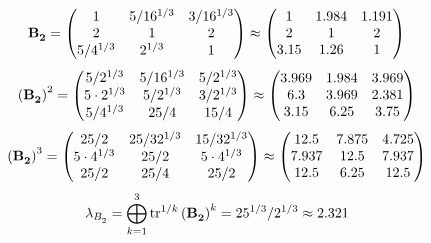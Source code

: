 \documentclass[10pt,a4paper]{article}
\begin{document}
	\[
		\bold{B_2^{}} = 
		\begin{pmatrix}
			{1}{} & {{5}} / {{16^ {1 / 3}}} & {{3}} / {{16^ {1 / 3}}} \\
			{{2}}{} & {1}{} & {{2}}{} \\
			{{5}} / {{4^ {1 / 3}}} & {{2^ {1 / 3}}}{} & {1}{} \\
		\end{pmatrix}
		\approx
		\begin{pmatrix}
			1        & 1.984    & 1.191    \\
			2        & 1        & 2        \\
			3.15     & 1.26     & 1        \\
		\end{pmatrix}
	\]
	\[
		\left(\bold{B_2^{}}\right)^{2} = 
		\begin{pmatrix}
			{{5}} / {{2^ {1 / 3}}} & {{5}} / {{16^ {1 / 3}}} & {{5}} / {{2^ {1 / 3}}} \\
			{{5} \cdot {2^ {1 / 3}}}{} & {{5}} / {{2^ {1 / 3}}} & {{3}} / {{2^ {1 / 3}}} \\
			{{5}} / {{4^ {1 / 3}}} & {{25}} / {{4}} & {{15}} / {{4}} \\
		\end{pmatrix}
		\approx
		\begin{pmatrix}
			3.969    & 1.984    & 3.969    \\
			6.3      & 3.969    & 2.381    \\
			3.15     & 6.25     & 3.75     \\
		\end{pmatrix}
	\]
	\[
		\left(\bold{B_2^{}}\right)^{3} = 
		\begin{pmatrix}
			{{25}} / {{2}} & {{25}} / {{32^ {1 / 3}}} & {{15}} / {{32^ {1 / 3}}} \\
			{{5} \cdot {4^ {1 / 3}}}{} & {{25}} / {{2}} & {{5} \cdot {4^ {1 / 3}}}{} \\
			{{25}} / {{2}} & {{25}} / {{4}} & {{25}} / {{2}} \\
		\end{pmatrix}
		\approx
		\begin{pmatrix}
			12.5     & 7.875    & 4.725    \\
			7.937    & 12.5     & 7.937    \\
			12.5     & 6.25     & 12.5     \\
		\end{pmatrix}
	\]
	\[
		\lambda_{B_2^{}} =  \bigoplus ^{3} _{k = 1} \operatorname{tr} ^{1 / k} \left( \bold{B_2^{}} \right)^k = {{25^ {1 / 3}}} / {{2^ {1 / 3}}}\approx 2.321
	\]
\end{document}
